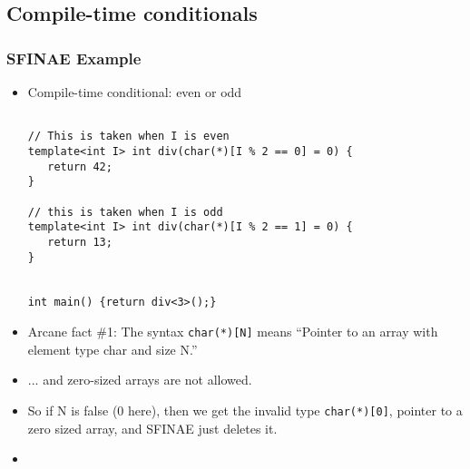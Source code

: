 \subsection{Compile-time conditionals}
\begin{frame}[fragile,t]
\frametitle{SFINAE Example}
\begin{itemize}[<+->]
\item Compile-time conditional: even or odd
{\scriptsize\begin{verbatim}

// This is taken when I is even
template<int I> int div(char(*)[I % 2 == 0] = 0) {
   return 42;
}

// this is taken when I is odd 
template<int I> int div(char(*)[I % 2 == 1] = 0) {
   return 13;
}


int main() {return div<3>();}

\end{verbatim}
}

\item Arcane fact \#1: The syntax \texttt{char(*)[N]} means ``Pointer to an
  array with element type char and size N.''
\item ... and zero-sized arrays are not allowed.
\item So if N is false (0 here), then we get the invalid type
  \texttt{char(*)[0]}, pointer to a zero sized array, and SFINAE just
  deletes it.
\vskip 12pt
\item {}
\end{itemize}
\end{frame}
